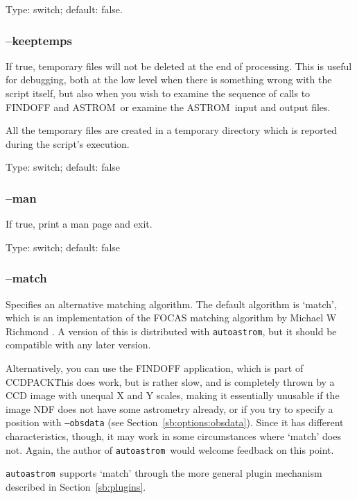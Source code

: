 \documentclass[twoside,11pt]{article}
\newcommand{\xref}[3]{#1}
\newcommand{\xlabel}[1]{}
\newcommand{\ASTROM}{{\footnotesize ASTROM}\normalsize}
\newcommand{\autoastrom}{\texttt{autoastrom}}
\newcommand{\CCDPACKref}{\xref{{\footnotesize CCDPACK}}{sun139}{}}
\begin{document}
Type: switch; default: false.

\subsubsection{\xlabel{sb_options_keeptemps}--keeptemps\label{sb:options:keeptemps}}

If true, temporary files will not be deleted at the end of processing.  This
is useful for debugging, both at the low level when there is something wrong
with the script itself, but also when you wish to examine the sequence of
calls to FINDOFF and \ASTROM\, or examine the \ASTROM\ input and output
files.

All the temporary files are created in a temporary directory which is
reported during the script's execution.

Type: switch; default: false

\subsubsection{\xlabel{sb_options_man}--man\label{sb:options:man}}

If true, print a man page and exit.

Type: switch; default: false

\subsubsection{\xlabel{sb_options_match}--match\label{sb:options:match}}

Specifies an alternative matching algorithm.  The default algorithm is
`match', which is an implementation of the FOCAS matching algorithm
\cite{valdes95} by Michael W Richmond \cite{match-home}.  A version of this is
distributed with \autoastrom, but it should be compatible with any later
version.

Alternatively, you can use the FINDOFF application, which is part of
\CCDPACKref\.  This does work, but is rather slow, and is completely thrown by
a CCD image with unequal X and Y scales, making it essentially unusable if the
image NDF does not have some astrometry already, or if you try to specify a
position with \texttt{--obsdata} (see Section~\ref{sb:options:obsdata}).
Since it has different characteristics, though, it may work in some
circumstances where `match' does not.  Again, the author of \autoastrom\ would
welcome feedback on this point.

\autoastrom\ supports `match' through the more general plugin mechanism
described in Section~\ref{sb:plugins}.
\end{document}
